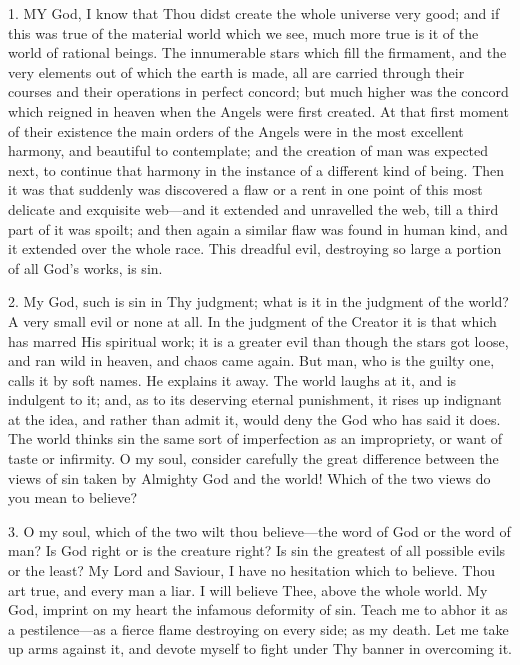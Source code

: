 
1. MY
God, I know that Thou didst create the whole universe very good; and if
this was true of the material world which we see, much more true is it
of the world of rational beings. The innumerable stars which fill the
firmament, and the very elements out of which the earth is made, all are
carried through their courses and their operations in perfect concord;
but much higher was the concord which reigned in heaven when the Angels
were first created. At that first moment of their existence the main
orders of the Angels were in the most excellent harmony, and beautiful
to contemplate; and the creation of man was expected next, to continue
that harmony in the instance of a different kind of being. Then it was
that suddenly was discovered a flaw or a rent in one point of this most
delicate and exquisite web—and it extended and unravelled the web,
till a third part of it was spoilt; and then again a similar flaw was
found in human kind, and it extended over the whole race. This dreadful
evil, destroying so large a portion of all God's works, is sin.

2. My God, such is sin in Thy
judgment; what is it in the judgment of the world? A very small evil or
none at all. In the judgment of the Creator it is that which has marred
His spiritual work; it is a greater evil than though the stars got
loose, and ran wild in heaven, and chaos came again. But man, who
is the guilty one, calls it by soft names. He explains it away. The
world laughs at it, and is indulgent to it; and, as to its deserving
eternal punishment, it rises up indignant at the idea, and rather than
admit it, would deny the God who has said it does. The world thinks sin
the same sort of imperfection as an impropriety, or want of taste or
infirmity. O my soul, consider carefully the great difference between
the views of sin taken by Almighty God and the world! Which of the two
views do you mean to believe?

3. O my soul, which of the two
wilt thou believe—the word of God or the word of man? Is God right or
is the creature right? Is sin the greatest of all possible evils or the
least? My Lord and Saviour, I have no hesitation which to believe. Thou
art true, and every man a liar. I will believe Thee, above the whole
world. My God, imprint on my heart the infamous deformity of sin. Teach
me to abhor it as a pestilence—as a fierce flame destroying on every
side; as my death. Let me take up arms against it, and devote myself to
fight under Thy banner in overcoming it.

